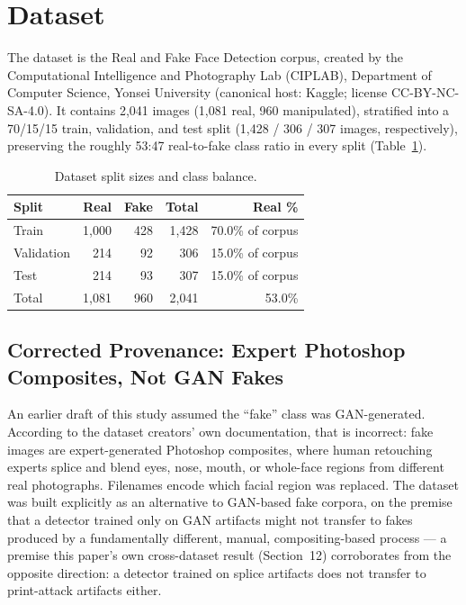 \documentclass[11pt]{article}
\begin{document}
\section{Dataset}

The dataset is the Real and Fake Face Detection corpus, created by the Computational Intelligence and Photography Lab (CIPLAB), Department of Computer Science, Yonsei University (canonical host: Kaggle; license CC-BY-NC-SA-4.0). It contains 2,041 images (1,081 real, 960 manipulated), stratified into a 70/15/15 train, validation, and test split (1,428 / 306 / 307 images, respectively), preserving the roughly 53:47 real-to-fake class ratio in every split (Table~\ref{tab:splits}).

\begin{table}[htbp]
\centering
\caption{Dataset split sizes and class balance.}
\label{tab:splits}
\begin{tabular}{lrrrr}
\toprule
Split & Real & Fake & Total & Real \% \\
\midrule
Train & 1,000 & 428 & 1,428 & 70.0\% of corpus \\
Validation & 214 & 92 & 306 & 15.0\% of corpus \\
Test & 214 & 93 & 307 & 15.0\% of corpus \\
\midrule
Total & 1,081 & 960 & 2,041 & 53.0\% \\
\bottomrule
\end{tabular}
\end{table}

\subsection{Corrected Provenance: Expert Photoshop Composites, Not GAN Fakes}

An earlier draft of this study assumed the ``fake'' class was GAN-generated. According to the dataset creators' own documentation, that is incorrect: fake images are expert-generated Photoshop composites, where human retouching experts splice and blend eyes, nose, mouth, or whole-face regions from different real photographs. Filenames encode which facial region was replaced. The dataset was built explicitly as an alternative to GAN-based fake corpora, on the premise that a detector trained only on GAN artifacts might not transfer to fakes produced by a fundamentally different, manual, compositing-based process --- a premise this paper's own cross-dataset result (Section~12) corroborates from the opposite direction: a detector trained on splice artifacts does not transfer to print-attack artifacts either.
\end{document}
